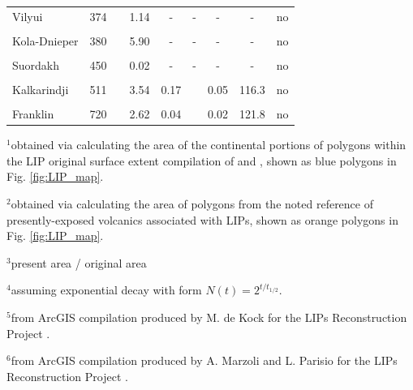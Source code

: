 \documentclass[11pt,letterpaper]{article}
\begin{document}
\begin{table}[h!]
{\begin{tabular}{lc>{\raggedright}p{4cm}cc>{\raggedright}p{4cm}ccl}
Vilyui & 374 & \cite{Ricci2013a} & 1.14 & - & - & - & - & no \\
 & & & & & & & & \\
Kola-Dnieper & 380 & \cite{Arzamastsev2014a} & 5.90 & - & - & - & - & no \\
 & & & & & & & & \\
Suordakh & 450 & \cite{Khudoley2013a} & 0.02 & - & - & - & - & no \\
 & & & & & & & & \\
Kalkarindji & 511 & \cite{Jourdan2014a} & 3.54 & 0.17 & \cite{Thorne2014a} & 0.05 & 116.3 & no \\
 & & & & & & & & \\
Franklin & 720 & \cite{Denyszyn2009a} & 2.62 & 0.04 & \cite{Buchan2004a} & 0.02 & 121.8 & no \\
\bottomrule
\end{tabular}
}
\begin{tablenotes}
\vspace{0.15cm}
$^{1}$obtained via calculating the area of the continental portions of polygons within the LIP original surface extent compilation of \citet{Ernst2017a} and \citet{Ernst2019a}, shown as blue polygons in Fig. \ref{fig:LIP_map}.
\vspace{0.15cm}

$^{2}$obtained via calculating the area of polygons from the noted reference of presently-exposed volcanics associated with LIPs, shown as orange polygons in Fig. \ref{fig:LIP_map}.
\vspace{0.15cm}

$^{3}$present area / original area
\vspace{0.15cm}

$^{4}$assuming exponential decay with form $N(t) = 2^{t/t_{1/2}}$.
\vspace{0.15cm}

$^{5}$from ArcGIS compilation produced by M. de Kock for the LIPs Reconstruction Project \citep{Ernst2013a}.
\vspace{0.15cm}

$^{6}$from ArcGIS compilation produced by A. Marzoli and L. Parisio for the LIPs Reconstruction Project \citep{Ernst2013a}.
\end{tablenotes}
\label{tab:LIPs}
\end{table}
\end{document}
